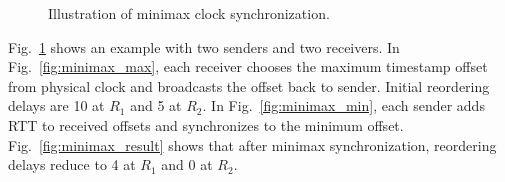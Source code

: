 \begin{figure}[t]
\centering

\caption{Illustration of minimax clock synchronization.}
\label{fig:minimax}
\vspace{-1.2em}
\end{figure}



Fig.~\ref{fig:minimax} shows an example with two senders and two receivers.
In Fig.~\ref{fig:minimax_max}, each receiver chooses the maximum timestamp offset from physical clock and broadcasts the offset back to sender.
Initial reordering delays are 10 at $R_1$ and 5 at $R_2$.
In Fig.~\ref{fig:minimax_min}, each sender adds RTT to received offsets and synchronizes to the minimum offset.
Fig.~\ref{fig:minimax_result} shows that after minimax synchronization, reordering delays reduce to 4 at $R_1$ and 0 at $R_2$.

